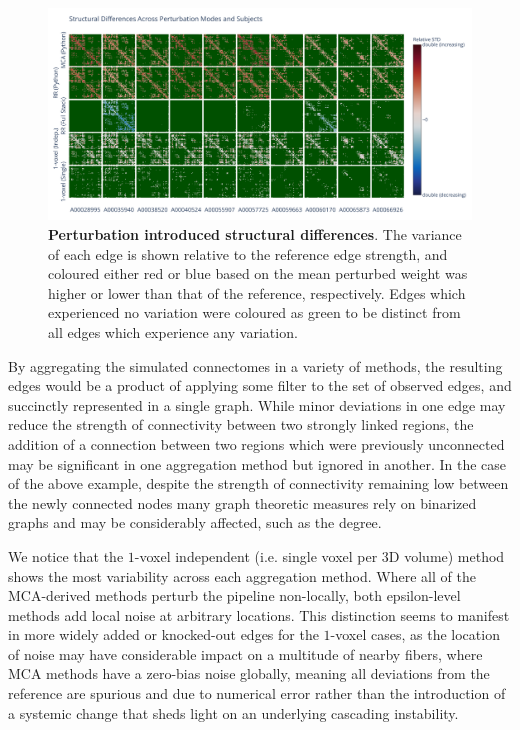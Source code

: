 \documentclass[fleqn,12pt]{SelfArx_ch} %
\begin{document}
\begin{figure}
    \centerline{\includegraphics[width=1.1\linewidth]{figures/fig4_directed_variance_structure_panel.pdf}}
    \caption{\textbf{Perturbation introduced structural differences}. The variance
    of each edge is shown relative to the reference edge strength, and coloured
    either red or blue based on the mean perturbed weight was higher or lower than
    that of the reference, respectively. Edges which experienced no variation were
    coloured as green to be distinct from all edges which experience any variation.}
    \label{fig4:structural_variances}
\end{figure}

By aggregating the simulated connectomes in a variety of methods, the resulting edges would be a product of applying
some filter to the set of observed edges, and succinctly represented in a single graph. While minor deviations in one
edge may reduce the strength of connectivity between two strongly linked regions, the addition of a connection between
two regions which were previously unconnected may be significant in one aggregation method but ignored in another. In
the case of the above example, despite the strength of connectivity remaining low between the newly connected nodes
many graph theoretic measures rely on binarized graphs and may be considerably affected, such as the degree.

We notice that the $1$-voxel independent (i.e. single voxel per $3$D volume) method shows the most variability across
each aggregation method. Where all of the MCA-derived methods perturb the pipeline non-locally, both epsilon-level
methods add local noise at arbitrary locations. This distinction seems to manifest in more widely added or knocked-out
edges for the $1$-voxel cases, as the location of noise may have considerable impact on a multitude of nearby fibers,
where MCA methods have a zero-bias noise globally, meaning all deviations from the reference are spurious and due to
numerical error rather than the introduction of a systemic change that sheds light on an underlying cascading
instability.
\end{document}
